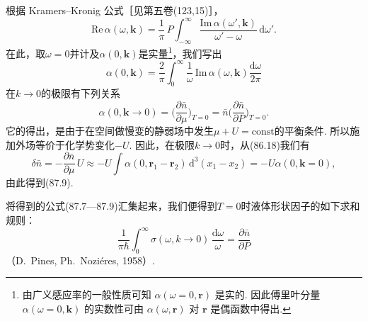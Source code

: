 根据 Kramers--Kronig 公式［见第五卷(123,15)］，
\begin{equation*}
\mathrm{Re}\,\alpha(\omega,\bm{k})=\frac{1}{\pi}\,P\int_{-\infty}^{\infty}\frac{\mathrm{Im}\,\alpha(\omega',\bm{k})}{\omega'-\omega}\,\mathrm{d}\omega'.
\end{equation*}
在此，取$\omega=0$并计及$\alpha(0,\bm{k})$是实量\footnote{由广义感应率的一般性质可知 $\alpha(\omega=0,\bm{r})$ 是实的. 因此傅里叶分量 $\alpha(\omega=0,\bm{k})$ 的实数性可由 $\alpha(\omega,\bm{r})$ 对 $\bm{r}$ 是偶函数中得出.}，我们写出
\begin{equation}
\alpha(0,\bm{k})=\frac{2}{\pi}\int_{0}^{\infty}\frac{1}{\omega}\,\mathrm{Im}\,\alpha(\omega,\bm{k})\frac{\mathrm{d}\omega}{2\pi}
\end{equation}
在$k\to0$的极限有下列关系
\begin{equation}
\alpha(0,\bm{k}\to0)=\biggl(\frac{\partial\bar{n}}{\partial\mu}\biggr)_{T=0}=\bar{n}\biggl(\frac{\partial\bar{n}}{\partial P}\biggr)_{T=0}.
\end{equation}
它的得出，是由于在空间做慢变的静弱场中发生$\mu+U=\mathrm{const}$的平衡条件. 所以施加外场等价于化学势变化$-U$. 因此，在极限$k\to0$时，从(86.18)我们有
\begin{equation*}
\delta\bar{n}=-\frac{\partial\bar{n}}{\partial\mu}\,U\approx-U\int\alpha(0,\bm{r}_{1}-\bm{r}_{2})\,\mathrm{d}^{3}(x_{1}-x_{2})=-U\alpha(0,\bm{k}=0),
\end{equation*}
由此得到(87.9).

将得到的公式(87.7—87.9)汇集起来，我们便得到$T=0$时液体形状因子的如下求和规则：
\begin{equation}
\frac{1}{\pi\hbar}\int_{0}^{\infty}\sigma(\omega,k{\to}0)\,\frac{\mathrm{d}\omega}{\omega}=\frac{\partial\bar{n}}{\partial P}
\end{equation}
（D.~Pines, Ph.~Nozi\'eres, 1958）.

